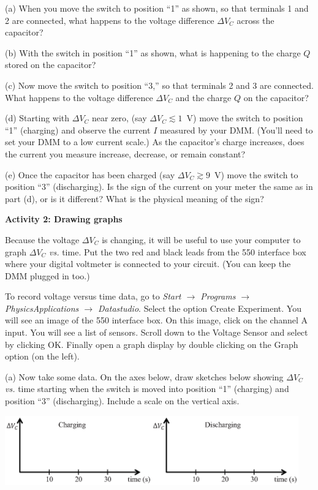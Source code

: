 (a) When you move the switch to position ``1'' as shown, so that terminals 1 and 2 are connected, what happens to the voltage difference $\Delta V_C$ across the capacitor?
\answerspace{0.6in}

(b)  With the switch in position ``1'' as shown, what is happening to the charge $Q$ stored on the capacitor?
\answerspace{0.6in}

(c)  Now move the switch to position ``3,'' so that terminals 2 and 3 are connected.  What happens to the voltage difference $\Delta V_C$ and the charge $Q$ on the capacitor?
\answerspace{0.7in}

\pagebreak[2]
(d) Starting with $\Delta V_C$ near zero, (say $\Delta V_C \lesssim 1$~V) move the switch to position ``1'' (charging) and observe the current $I$ measured by your DMM.  (You'll need to set your DMM to a low current scale.)  As the capacitor's charge increases, does the current you measure increase, decrease, or remain constant?
\answerspace{0.5in}

(e) Once the capacitor has been charged (say $\Delta V_C \gtrsim 9$~V) move the switch to position ``3'' (discharging).  Is the sign of the current on your meter the same as in part (d), or is it different?  What is the physical meaning of the sign?
\answerspace{0.7in}

\textbf{Activity 2: Drawing graphs}

Because the voltage $\Delta V_C$ is changing, it will be useful to use your computer to graph $\Delta V_C$ \textit{vs.} time.  Put the two red and black leads from the 550 interface box where your digital voltmeter is connected to your circuit.  (You can keep the DMM plugged in too.)

To record voltage versus time data, go to \textit{Start $\longrightarrow$ Programs $\longrightarrow$ PhysicsApplications $\longrightarrow$ Datastudio}. Select the option Create Experiment.  You will see an image of the 550 interface box.  On this image, click on the channel A input.  You will see a list of sensors.  Scroll down to the Voltage Sensor and select by clicking OK.  Finally open a graph display by double clicking on the Graph option (on the left).

(a)  Now take some data.  On the axes below, draw sketches below showing $\Delta V_C$ \textit{vs.} time starting when the switch is moved into position ``1'' (charging) and position ``3'' (discharging).  Include a scale on the vertical axis.

\begin{center}
\vspace{-0.4 in}
\includegraphics[width=0.95\textwidth]{rc_circuits/vc_axes.eps}
\vspace{-0.1 in}
\end{center}

